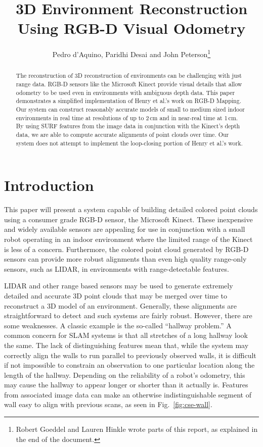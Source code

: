 \documentclass[letterpaper, 10pt, conference]{ieeeconf}
\title{\LARGE \bf
    3D Environment Reconstruction Using RGB-D Visual Odometry
}
\author{Pedro d'Aquino, Paridhi Desai and John Peterson\thanks{Robert Goeddel and Lauren Hinkle
wrote parts of this report, as explained in the end of the document.}}
\begin{document}
\maketitle

\begin{abstract}
The reconstruction of 3D reconstruction of environments can be challenging with just range
data. RGB-D sensors like the Microsoft Kinect provide visual details that
allow odometry to be used even in environments with ambiguous depth data.
This paper demonstrates a simplified implementation of Henry et al.'s work
on RGB-D Mapping.~\cite{Henry2010RGBd}
Our system can construct reasonably accurate models of
small to medium sized indoor environments in real time at resolutions of up
to 2\,cm and in near-real time at 1\,cm. By using SURF features from the image
data in conjunction with the Kinect's depth data, we are able to compute
accurate alignments of point clouds over time. Our system does not attempt to
implement the loop-closing portion of Henry et al.'s work.
\end{abstract}

\section{Introduction}
This paper will present a system capable of building detailed colored point
clouds using a consumer grade RGB-D sensor, the Microsoft Kinect. These inexpensive and widely
 available sensors are appealing for use in conjunction with a small robot operating in an indoor environment where the limited range of the Kinect is less of a concern. Furthermore, the colored point cloud generated by RGB-D sensors can provide more robust alignments than even high
quality range-only sensors, such as LIDAR, in environments with range-detectable
features.

LIDAR and other range based sensors may be used to generate extremely detailed
and accurate 3D point clouds that may be merged over time to reconstruct a 3D
model of an environment. Generally, these alignments are straightforward to
detect and such systems are fairly robust. However, there are some weaknesses.
A classic example is the so-called ``hallway problem.'' A common concern for
SLAM systems is that all stretches of a long hallway look the same. The lack
of distinguishing features mean that, while the system may correctly align the walls
to run parallel to previously observed walls, it is difficult if not
impossible to constrain an observation to one particular location along the length of the hallway. Depending on the reliability of a robot's odometry, this may cause the hallway to appear longer or 
shorter than it actually is. Features from associated image data can
make an otherwise indistinguishable segment of wall easy to align with
previous scans, as seen in Fig.~\ref{fig:cse-wall}.
\end{document}
